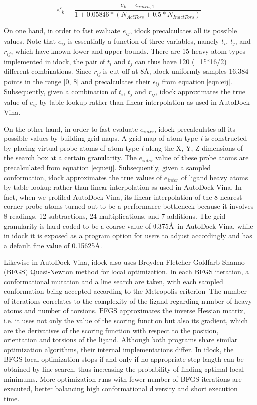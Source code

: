 \begin{equation}
\label{eqn:FlexibilityPenalty}
e'_k = \frac{e_k - e_{intra,1}}{1 + 0.05846 * (N_{ActTors} + 0.5 * N_{InactTors})}
\end{equation}

On one hand, in order to fast evaluate $e_{ij}$, idock precalculates all its possible values. Note that $e_{ij}$ is essentially a function of three variables, namely $t_i$, $t_j$, and $r_{ij}$, which have known lower and upper bounds. There are 15 heavy atom types implemented in idock, the pair of $t_i$ and $t_j$ can thus have 120 (=15*16/2) different combinations. Since $r_{ij}$ is cut off at 8\AA, idock uniformly samples 16,384 points in the range [0, 8] and precalculates their $e_{ij}$ from equation \eqref{eqn:eij}. Subsequently, given a combination of $t_i$, $t_j$ and $r_{ij}$, idock approximates the true value of $e_{ij}$ by table lookup rather than linear interpolation as used in AutoDock Vina.

On the other hand, in order to fast evaluate $e_{inter}$, idock precalculates all its possible values by building grid maps. A grid map of atom type \textit{t} is constructed by placing virtual probe atoms of atom type \textit{t} along the X, Y, Z dimensions of the search box at a certain granularity. The $e_{inter}$ value of these probe atoms are precalculated from equation \eqref{eqn:eij}. Subsequently, given a sampled conformation, idock approximates the true values of $e_{inter}$ of ligand heavy atoms by table lookup rather than linear interpolation as used in AutoDock Vina. In fact, when we profiled AutoDock Vina, its linear interpolation of the 8 nearest corner probe atoms turned out to be a performance bottleneck because it involves 8 readings, 12 subtractions, 24 multiplications, and 7 additions. The grid granularity is hard-coded to be a coarse value of 0.375\AA\ in AutoDock Vina, while in idock it is exposed as a program option for users to adjust accordingly and has a default fine value of 0.15625\AA.

Likewise in AutoDock Vina, idock also uses Broyden-Fletcher-Goldfarb-Shanno (BFGS) \citep{786} Quasi-Newton method for local optimization. In each BFGS iteration, a conformational mutation and a line search are taken, with each sampled conformation being accepted according to the Metropolis criterion. The number of iterations correlates to the complexity of the ligand regarding number of heavy atoms and number of torsions. BFGS approximates the inverse Hessian matrix, i.e. it uses not only the value of the scoring function but also its gradient, which are the derivatives of the scoring function with respect to the position, orientation and torsions of the ligand. Although both programs share similar optimization algorithms, their internal implementations differ. In idock, the BFGS local optimization stops if and only if no appropriate step length can be obtained by line search, thus increasing the probability of finding optimal local minimums. More optimization runs with fewer number of BFGS iterations are executed, better balancing high conformational diversity and short execution time.

